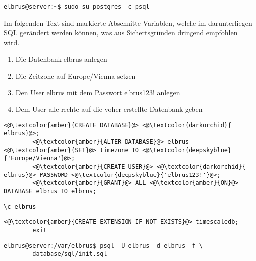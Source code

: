 	\lstset{style=commands}
	\begin{lstlisting}[caption={Verbinden mit dem interaktiven Terminal von 'postgres'.}]
		elbrus@server:~$ sudo su postgres -c psql
	\end{lstlisting}
	Im folgenden Text sind markierte Abschnitte Variablen, welche im darunterliegen SQL gerändert werden können, was aus Sichertsgründen dringend empfohlen wird.
	\begin{enumerate}
		\item Die Datenbank elbrus anlegen
		\item Die Zeitzone auf Europe/Vienna setzen
		\item Den User elbrus mit dem Passwort elbrus123! anlegen
		\item Dem User alle rechte auf die voher erstellte Datenbank geben
	\end{enumerate}	
	
	\lstset{style=files}
	\begin{lstlisting}[caption={Auführen von SQL Befehlen.}, numbers=none]
		<@\textcolor{amber}{CREATE DATABASE}@> <@\textcolor{darkorchid}{ elbrus}@>;
		<@\textcolor{amber}{ALTER DATABASE}@> elbrus <@\textcolor{amber}{SET}@> timezone TO <@\textcolor{deepskyblue}{'Europe/Vienna'}@>;
		<@\textcolor{amber}{CREATE USER}@> <@\textcolor{darkorchid}{ elbrus}@> PASSWORD <@\textcolor{deepskyblue}{'elbrus123!'}@>;
		<@\textcolor{amber}{GRANT}@> ALL <@\textcolor{amber}{ON}@> DATABASE elbrus TO elbrus;
	\end{lstlisting}
	
	\begin{lstlisting}[caption={Wechseln zu erstellter Datenbank.}, numbers=none]
		\c elbrus
	\end{lstlisting}
	
	\begin{lstlisting}[caption={Hinzufügen der TimescaleDB Erweiterung.}, numbers=none]
		<@\textcolor{amber}{CREATE EXTENSION IF NOT EXISTS}@> timescaledb;
		exit
	\end{lstlisting}
	
	\lstset{style=commands}
	\begin{lstlisting}[caption={Anlegen der benötigten Tabellen duch das ausführen von 'init.sql'.}]
		elbrus@server:/var/elbrus$ psql -U elbrus -d elbrus -f \
		database/sql/init.sql
	\end{lstlisting}